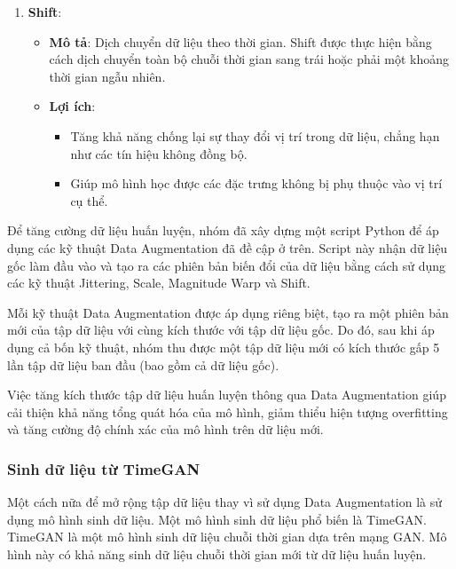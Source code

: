 \begin{enumerate}
\item \textbf{Shift}: 
 \begin{itemize}
 \item \textbf{Mô tả}: Dịch chuyển dữ liệu theo thời gian. Shift được thực hiện bằng cách dịch chuyển toàn bộ chuỗi thời gian sang trái hoặc phải một khoảng thời gian ngẫu nhiên.
 \item \textbf{Lợi ích}:
\begin{itemize}
\item Tăng khả năng chống lại sự thay đổi vị trí trong dữ liệu, chẳng hạn như các tín hiệu không đồng bộ.
\item Giúp mô hình học được các đặc trưng không bị phụ thuộc vào vị trí cụ thể.
\end{itemize}
\end{itemize}

\end{enumerate}

Để tăng cường dữ liệu huấn luyện, nhóm đã xây dựng một script Python để áp dụng các kỹ thuật Data Augmentation đã đề cập ở trên. Script này nhận dữ liệu gốc làm đầu vào và tạo ra các phiên bản biến đổi của dữ liệu bằng cách sử dụng các kỹ thuật Jittering, Scale, Magnitude Warp và Shift.

Mỗi kỹ thuật Data Augmentation được áp dụng riêng biệt, tạo ra một phiên bản mới của tập dữ liệu với cùng kích thước với tập dữ liệu gốc. Do đó, sau khi áp dụng cả bốn kỹ thuật, nhóm thu được một tập dữ liệu mới có kích thước gấp 5 lần tập dữ liệu ban đầu (bao gồm cả dữ liệu gốc). 

Việc tăng kích thước tập dữ liệu huấn luyện thông qua Data Augmentation giúp cải thiện khả năng tổng quát hóa của mô hình, giảm thiểu hiện tượng overfitting và tăng cường độ chính xác của mô hình trên dữ liệu mới.

\subsubsection{Sinh dữ liệu từ TimeGAN}
Một cách nữa để mở rộng tập dữ liệu thay vì sử dụng Data Augmentation là sử dụng mô hình sinh dữ liệu. Một mô hình sinh dữ liệu phổ biến là TimeGAN. TimeGAN là một mô hình sinh dữ liệu chuỗi thời gian dựa trên mạng GAN. Mô hình này có khả năng sinh dữ liệu chuỗi thời gian mới từ dữ liệu huấn luyện.

